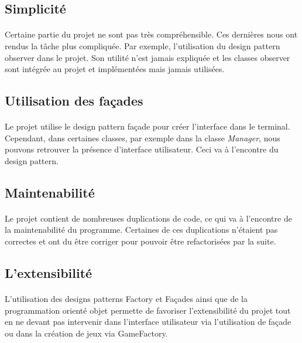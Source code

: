 \vspace{\baselineskip}
\subsection{Simplicité}
    \paragraph{}
        Certaine partie du projet ne sont pas très compréhensible. Ces dernières nous ont rendus la tâche plus compliquée. Par exemple, l'utilisation du design pattern observer dans le projet. Son utilité n'est jamais expliquée et les classes observer sont intégrée au projet et implémentées mais jamais utilisées. 

\vspace{\baselineskip}
\subsection{Utilisation des façades}
    \paragraph{}
        Le projet utilise le design pattern façade pour créer l'interface dans le terminal. Cependant, dans certaines classes, par exemple dans la classe \textit{Manager}, nous pouvons retrouver la présence d'interface utilisateur. Ceci va à l'encontre du design pattern.

\vspace{\baselineskip}       
\subsection{Maintenabilité}
    \paragraph{}
        Le projet contient de nombreuses duplications de code, ce qui va à l'encontre de la maintenabilité du programme. Certaines de ces duplications n'étaient pas correctes et ont du être corriger pour pouvoir être refactorisées par la suite.
        
\vspace{\baselineskip}
\subsection{L'extensibilité}
    \paragraph{}
        L'utilisation des designs patterns Factory et Façades ainsi que de la programmation orienté objet permette de favoriser l'extensibilité du projet tout en ne devant pas intervenir dans l'interface utilisateur via l'utilisation de façade ou dans la création de jeux via GameFactory.
        
